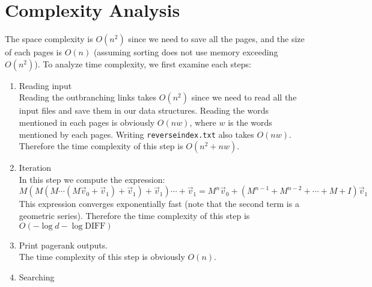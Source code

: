 \documentclass[12pt]{article}
\begin{document}
\section{Complexity Analysis}%
The space complexity is $O\left(n^2\right)$ since we need to save all the pages,
and the size of each pages is $O(n)$ (assuming sorting does not use memory exceeding
$O\left(n^2\right)$). To analyze time complexity, we first examine
each steps:

\begin{enumerate}
	\item Reading input\\
	Reading the outbranching links takes $O\left(n^2\right)$ since we need to
	read all the input files and save them in our data structures. Reading
	the words mentioned in each pages is obviously $O(nw)$, where $w$ is the words
	mentioned by each pages. Writing \texttt{reverseindex.txt} also takes
	$O(nw)$. Therefore the time complexity of this step is $O\left(n^2+nw\right)$.
		
	\item Iteration\\
	In this step we compute the expression:
	\begin{equation*}
		M(M(M \cdots (M\vec{v}_0 + \vec{v}_1) + \vec{v}_1 ) + \vec{v}_1) \cdots + \vec{v} _1 
		= M^n \vec{v}_0 + \left(M^{n-1} + M^{n-2} + \cdots+ M + I\right) \vec{v}_1 
	\end{equation*}
	This expression converges exponentially fast (note that the second term is 
	a geometric series). Therefore the time complexity of this step is
	$O\left(-\log d - \log \text{DIFF}\right)$

	\item Print pagerank outputs.\\
	The time complexity of this step is obviously $O(n)$.

	\item Searching\\

\end{enumerate}
\end{document}
